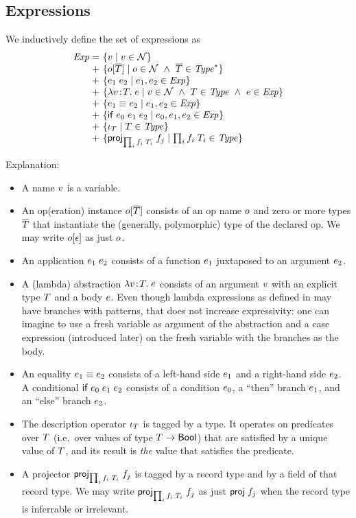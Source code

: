 \subsection{Expressions}

We inductively define the set of expressions as
\[
\setdefVIIIoI
 {\Expr}
 {+}
 {\setST{\var}{\var\in\Nam}}
 {\setST{\opO}{\onam\in\Nam\AND\typS\in\Seq{\Typ}}}
 {\setST{\appO}{\expr_1,\expr_2\in\Expr}}
 {\setST{\absO}{\var\in\Nam\AND\typ\in\Typ\AND\expr\in\Expr}}
 {\setST{\eqO}{\expr_1,\expr_2\in\Expr}}
 {\setST{\iifO}{\expr_0,\expr_1,\expr_2\in\Expr}}
 {\setST{\descopO}{\typ\in\Typ}}
\setdefVIIIoII
 {+}
 {\setST{\projopO}{\trecO\in\Typ}}
\]

Explanation:
\begin{itemize}
\item
A name $v$ is a variable.
\item
An op(eration) instance $o[\overline{T}]$ consists of an op name $o$ and zero or more
types $\overline{T}$ that instantiate the (generally, polymorphic) type of the
declared op. We may write $o[\epsilon]$ as just $o$.
\item
An application $e_1\;e_2$ consists of a function $e_1$ juxtaposed to an
argument $e_2$.
\item
A (lambda) abstraction $\lambda v\!:\!T.\;e$ consists of an argument $v$ with an explicit
type $T$ and a body $e$. Even though lambda expressions as defined in
\cite{lm} may have branches with patterns, that does not increase
expressivity: one can imagine to use a fresh variable as argument of the
abstraction and a case expression (introduced later) on the fresh variable
with the branches as the body.
\item
An equality $e_1\equiv e_2$ consists of a left-hand side $e_1$ and a right-hand
side $e_2$.
A conditional $\mathsf{if}\;e_0\;e_1\;e_2$ consists of a condition $e_0$, a ``then'' branch
$e_1$, and an ``else'' branch $e_2$.
\item
The description operator $\iota_{T}$ is tagged by a type. It operates on
predicates over $T$ (i.e.\ over values of type $T\to\mathsf{Bool}$) that
are satisfied by a unique value of $T$, and its result is \emph{the} value
that satisfies the predicate.
\item
A projector $\mathsf{proj}_{\prod_{i}f_i\;T_i}\;{f_j}$ is tagged by a record type and by a field of that
record type. We may write $\mathsf{proj}_{\prod_{i}f_i\;T_i}\;{f_j}$ as just $\mathsf{proj}\;{f_j}$ when the record type is
inferrable or irrelevant.

\end{itemize}
